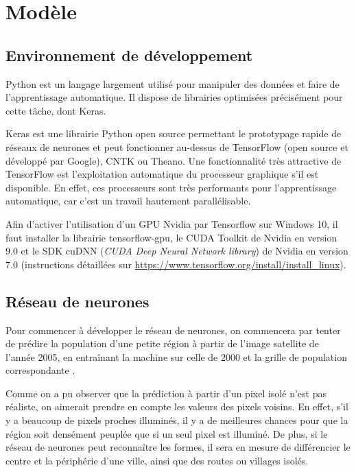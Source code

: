 \documentclass[a4paper, 11pt]{report}
\begin{document}
\chapter{Modèle}
\section{Environnement de développement}
Python est un langage largement utilisé pour manipuler des données et faire de l'apprentissage automatique. Il dispose de librairies optimisées précisément pour cette tâche, dont Keras.

Keras est une librairie Python open source permettant le prototypage rapide de réseaux de neurones et peut fonctionner au-dessus de TensorFlow (open source et développé par Google), CNTK ou Theano. Une fonctionnalité très attractive de TensorFlow est l'exploitation automatique du processeur graphique s'il est disponible. En effet, ces processeurs sont très performants pour l'apprentissage automatique, car c'est un travail hautement parallélisable.

Afin d'activer l'utilisation d'un GPU Nvidia par Tensorflow sur Windows 10, il faut installer la librairie tensorflow-gpu, le CUDA Toolkit de Nvidia en version 9.0 et le SDK cuDNN (\textit{CUDA Deep Neural Network library}) de Nvidia en version 7.0 (instructions détaillées sur \url{https://www.tensorflow.org/install/install_linux}).

\section{Réseau de neurones}
Pour commencer à développer le réseau de neurones, on commencera par tenter de prédire la population d'une petite région à partir de l'image satellite de l'année 2005, en entraînant la machine sur celle de 2000 et la grille de population correspondante \cite{sedac}.

Comme on a pu observer que la prédiction à partir d'un pixel isolé n'est pas réaliste, on aimerait prendre en compte les valeurs des pixels voisins. En effet, s'il y a beaucoup de pixels proches illuminés, il y a de meilleures chances pour que la région soit densément peuplée que si un seul pixel est illuminé. De plus, si le réseau de neurones peut reconnaître les formes, il sera en mesure de différencier le centre et la périphérie d'une ville, ainsi que des routes ou villages isolés.
\end{document}
